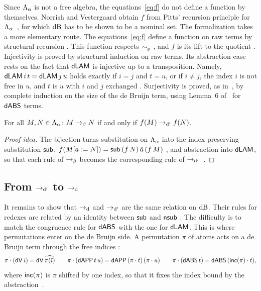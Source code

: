 Since $\Lambda_{\alpha}$ is not a free algebra, the equations~\eqref{eq:f} do not
define a function by themselves. Norrish and Vestergaard obtain $f$
from Pitts' recursion principle for
$\Lambda_{\alpha}$~\cite{pitts2006a}, for which $\mathrm{dB}$ has to be shown to be
a nominal set. The formalization takes a more elementary route. The
equations~\eqref{eq:f} define a function on raw terms by structural
recursion
.
This function respects $\sim_{\mathrm{p}}$
,
and $f$ is its lift to the quotient
.
Injectivity
is proved by structural induction on raw terms. Its abstraction case
rests on the fact that $\mathsf{dLAM}$ is injective up to a transposition.
Namely, $\mathsf{dLAM}\, i\, t = \mathsf{dLAM}\, j\, u$ holds exactly if $i = j$ and
$t = u$, or if $i \neq j$, the index $i$ is not free in $u$, and $t$
is $u$ with $i$ and $j$ exchanged
.
Surjectivity
is proved, as in~\cite{norrish2007a}, by complete induction on the size
of the de Bruijn term, using Lemma~6 of~\cite{norrish2007a} for
$\mathsf{dABS}$ terms.

\begin{theorem}
\label{thm:beta-dbeta-prime}
For all $M, N \in \Lambda_{\alpha}$: $M \to_{\beta} N$ if and only if
$f(M) \to_{\mathrm{d}'} f(N)$.
\end{theorem}

\begin{proof}[Proof idea]
The bijection turns substitution on $\Lambda_{\alpha}$ into the index-preserving
substitution $\mathsf{sub}$,
$f(M[a \mathrel{{:}{=}} N]) = \mathsf{sub}\, (f\, N)\, \hat{a}\, (f\, M)$
, and abstraction
into $\mathsf{dLAM}$, so that each rule of $\to_{\beta}$ becomes the
corresponding rule of $\to_{\mathrm{d}'}$~\cite[proof of
Theorem~12]{norrish2007a}.
\end{proof}


\subsection{From $\to_{\mathrm{d}'}$ to $\to_{\mathrm{d}}$}
\label{subsec:dbeta}

It remains to show that $\to_{\mathrm{d}}$ and $\to_{\mathrm{d}'}$ are the same relation on
$\mathrm{dB}$. Their rules for redexes are related by an identity between
$\mathsf{sub}$ and $\mathsf{nsub}$
\cite[Lemma~13]{norrish2007a}. The difficulty is
to match the congruence rule for $\mathsf{dABS}$ with the one for $\mathsf{dLAM}$.
This is where permutations enter on the de Bruijn side. A permutation
$\pi$ of atoms acts on a de Bruijn term through the free indices
:
\[
  \pi \cdot (\mathsf{dV}\, i) = \mathsf{dV}\, \widehat{\pi(\hat{\imath})}
  \qquad
  \pi \cdot (\mathsf{dAPP}\, t\, u) = \mathsf{dAPP}\, (\pi \cdot t)\, (\pi \cdot u)
  \qquad
  \pi \cdot (\mathsf{dABS}\, t) = \mathsf{dABS}\, (\mathsf{inc}(\pi) \cdot t),
\]
where $\mathsf{inc}(\pi)$ is $\pi$ shifted by one index, so that it fixes the
index bound by the abstraction~\cite[Definition~8]{norrish2007a}.

